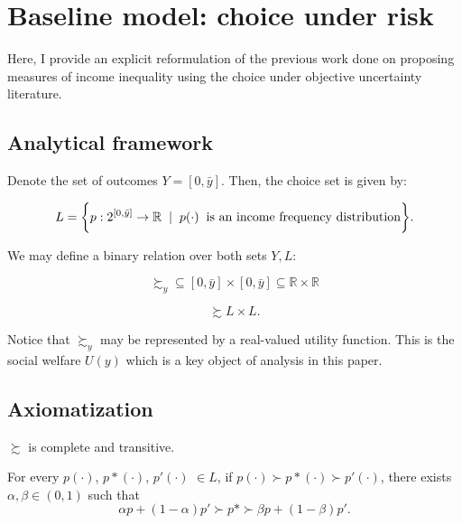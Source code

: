 \documentclass[\econtexRoot/IneqMeas]{subfiles}
\begin{document}
\onlyinsubfile{\setcounter{section}{1}}
\section{Baseline model: choice under risk}
\notinsubfile{\label{sec:BaselineModel}}

\par Here, I provide an explicit reformulation of the previous work done on proposing measures of income inequality using the choice under objective uncertainty literature.

\subsection{Analytical framework}

\par Denote the set of outcomes $Y = [0,\bar{y}]$. Then, the choice set is given by:

$$ L = \bigg\{ p: 2^{[0,\bar{y}]} \to \mathbb{R} \hspace{2mm} | \hspace{2mm} p(\cdot) \hspace{2mm} \text{is an income frequency distribution}  \bigg\}. $$

\par We may define a binary relation over both sets $Y,L:$

$$ \succsim_{y} \subseteq [0,\bar{y}] \times [0,\bar{y}] \subseteq \mathbb{R} \times \mathbb{R} $$

$$ \succsim L \times L. $$

\par Notice that $\succsim_y$ may be represented by a real-valued utility function. This is the social welfare $U(y)$ which is a key object of analysis in this paper. 

\subsection{Axiomatization}

\begin{ax.V}
$\succsim$ is complete and transitive.
\end{ax.V}

\begin{ax.V}[Continuity]
For every $p(\cdot)$, $p*(\cdot)$, $p'(\cdot)$ $\in L$, if $p(\cdot) \succ p*(\cdot) \succ p'(\cdot) $, there exists $\alpha, \beta \in (0,1)$ such that 
$$ \alpha p + (1-\alpha)p' \succ p* \succ \beta p + (1-\beta) p' .$$ 
\end{ax.V}
\end{document}
